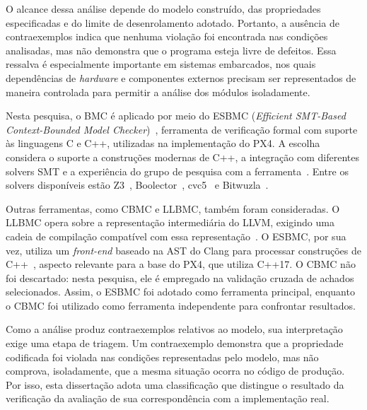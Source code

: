 O alcance dessa análise depende do modelo construído, das propriedades especificadas e do limite de desenrolamento adotado. Portanto, a ausência de contraexemplos indica que nenhuma violação foi encontrada nas condições analisadas, mas não demonstra que o programa esteja livre de defeitos. Essa ressalva é especialmente importante em sistemas embarcados, nos quais dependências de \textit{hardware} e componentes externos precisam ser representados de maneira controlada para permitir a análise dos módulos isoladamente.

Nesta pesquisa, o BMC é aplicado por meio do ESBMC (\textit{Efficient SMT-Based Context-Bounded Model Checker})~\cite{Cordeiro2012}, ferramenta de verificação formal com suporte às linguagens C e C++, utilizadas na implementação do PX4. A escolha considera o suporte a construções modernas de C++, a integração com diferentes solvers SMT e a experiência do grupo de pesquisa com a ferramenta~\cite{Menezes2024,Song2024}. Entre os solvers disponíveis estão Z3~\cite{deMoura2008}, Boolector~\cite{Brummayer2009}, cvc5~\cite{Barbosa2022} e Bitwuzla~\cite{Niemetz2023}.

Outras ferramentas, como CBMC e LLBMC, também foram consideradas. O LLBMC opera sobre a representação intermediária do LLVM, exigindo uma cadeia de compilação compatível com essa representação~\cite{Merz2012}. O ESBMC, por sua vez, utiliza um \textit{front-end} baseado na AST do Clang para processar construções de C++~\cite{Song2024}, aspecto relevante para a base do PX4, que utiliza C++17. O CBMC não foi descartado: nesta pesquisa, ele é empregado na validação cruzada de achados selecionados. Assim, o ESBMC foi adotado como ferramenta principal, enquanto o CBMC foi utilizado como ferramenta independente para confrontar resultados.

Como a análise produz contraexemplos relativos ao modelo, sua interpretação exige uma etapa de triagem. Um contraexemplo demonstra que a propriedade codificada foi violada nas condições representadas pelo modelo, mas não comprova, isoladamente, que a mesma situação ocorra no código de produção. Por isso, esta dissertação adota uma classificação que distingue o resultado da verificação da avaliação de sua correspondência com a implementação real.

